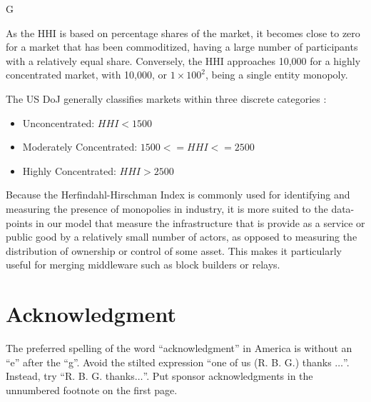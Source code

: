 G\documentclass[conference]{IEEEtran}
\begin{document}
As the HHI is based on percentage shares of the market, it becomes close to zero for a market that has been commoditized, having a large number of participants with a relatively equal share.  Conversely, the HHI approaches 10,000 for a highly concentrated market, with 10,000, or $1 \times 100^2 $, being a single entity monopoly.

The US DoJ generally classifies markets within three discrete categories \cite{usdoj2015}:

\begin{itemize}
    \item Unconcentrated: $HHI < 1500$ 
    \item Moderately Concentrated: $1500 <= HHI <= 2500$
    \item Highly Concentrated: $HHI > 2500$
\end{itemize}

Because the Herfindahl-Hirschman Index is commonly used for identifying and measuring the presence of monopolies in industry, it is more suited to the data-points in our model that measure the infrastructure that is provide as a service or public good by a relatively small number of actors, as opposed to measuring the distribution of ownership or control of some asset.  This makes it particularly useful for merging middleware such as block builders or relays.

\section*{Acknowledgment}

The preferred spelling of the word ``acknowledgment'' in America is without 
an ``e'' after the ``g''. Avoid the stilted expression ``one of us (R. B. 
G.) thanks $\ldots$''. Instead, try ``R. B. G. thanks$\ldots$''. Put sponsor 
acknowledgments in the unnumbered footnote on the first page.


\vspace{12pt}

\printbibliography
\end{document}
